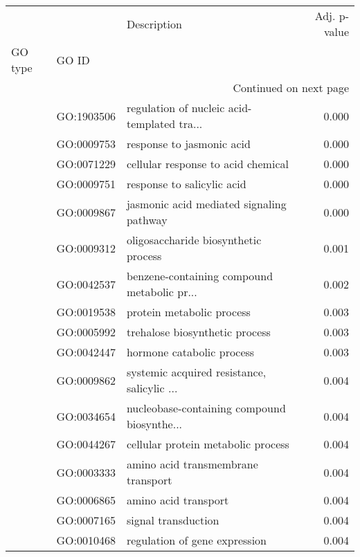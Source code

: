 \begin{longtable}{lllr}
\toprule
   &            &                                  Description &  Adj. p-value \\
GO type & GO ID &                                              &               \\
\midrule
\endhead
\midrule
\multicolumn{4}{r}{{Continued on next page}} \\
\midrule
\endfoot

\bottomrule
\endlastfoot
\multirow{76}{*}{BP} & GO:1903506 &  regulation of nucleic acid-templated tra... &         0.000 \\
   & GO:0009753 &                    response to jasmonic acid &         0.000 \\
   & GO:0071229 &           cellular response to acid chemical &         0.000 \\
   & GO:0009751 &                   response to salicylic acid &         0.000 \\
   & GO:0009867 &     jasmonic acid mediated signaling pathway &         0.000 \\
   & GO:0009312 &         oligosaccharide biosynthetic process &         0.001 \\
   & GO:0042537 &  benzene-containing compound metabolic pr... &         0.002 \\
   & GO:0019538 &                    protein metabolic process &         0.003 \\
   & GO:0005992 &               trehalose biosynthetic process &         0.003 \\
   & GO:0042447 &                    hormone catabolic process &         0.003 \\
   & GO:0009862 &  systemic acquired resistance, salicylic ... &         0.004 \\
   & GO:0034654 &  nucleobase-containing compound biosynthe... &         0.004 \\
   & GO:0044267 &           cellular protein metabolic process &         0.004 \\
   & GO:0003333 &           amino acid transmembrane transport &         0.004 \\
   & GO:0006865 &                         amino acid transport &         0.004 \\
   & GO:0007165 &                          signal transduction &         0.004 \\
   & GO:0010468 &                regulation of gene expression &         0.004 \\

\end{longtable}
